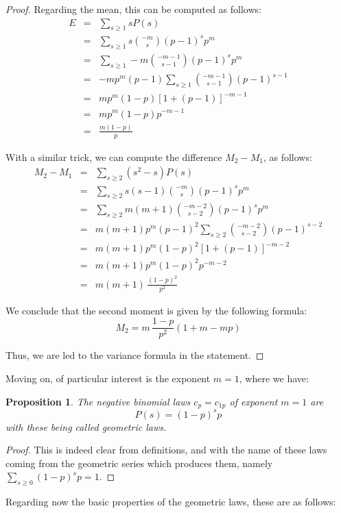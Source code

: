 \documentclass[12pt]{amsbook}
\newtheorem{proposition}[theorem]{Proposition}
\begin{document}
\begin{proof}
Regarding the mean, this can be computed as follows:
\begin{eqnarray*}
E
&=&\sum_{s\geq1}sP(s)\\
&=&\sum_{s\geq1}s\binom{-m}{s}(p-1)^sp^m\\
&=&\sum_{s\geq1}-m\binom{-m-1}{s-1}(p-1)^sp^m\\
&=&-mp^m(p-1)\sum_{s\geq1}\binom{-m-1}{s-1}(p-1)^{s-1}\\
&=&mp^m(1-p)[1+(p-1)]^{-m-1}\\
&=&mp^m(1-p)p^{-m-1}\\
&=&\frac{m(1-p)}{p}
\end{eqnarray*}

With a similar trick, we can compute the difference $M_2-M_1$, as follows:
\begin{eqnarray*}
M_2-M_1
&=&\sum_{s\geq2}(s^2-s)P(s)\\
&=&\sum_{s\geq2}s(s-1)\binom{-m}{s}(p-1)^sp^m\\
&=&\sum_{s\geq2}m(m+1)\binom{-m-2}{s-2}(p-1)^sp^m\\
&=&m(m+1)p^m(p-1)^2\sum_{s\geq2}\binom{-m-2}{s-2}(p-1)^{s-2}\\
&=&m(m+1)p^m(1-p)^2[1+(p-1)]^{-m-2}\\
&=&m(m+1)p^m(1-p)^2p^{-m-2}\\
&=&m(m+1)\,\frac{(1-p)^2}{p^2}
\end{eqnarray*}

We conclude that the second moment is given by the following formula:
$$M_2
=m\,\frac{1-p}{p^2}(1+m-mp)$$

Thus, we are led to the variance formula in the statement.
\end{proof}

Moving on, of particular interest is the exponent $m=1$, where we have:


\begin{proposition}
The negative binomial laws $c_p=c_{1p}$ of exponent $m=1$ are
$$P(s)=(1-p)^sp$$
with these being called geometric laws.
\end{proposition}

\begin{proof}
This is indeed clear from definitions, and with the name of these laws coming from the geometric series which produces them, namely $\sum_{s\geq0}(1-p)^sp=1$.
\end{proof}

Regarding now the basic properties of the geometric laws, these are as follows:
\end{document}

